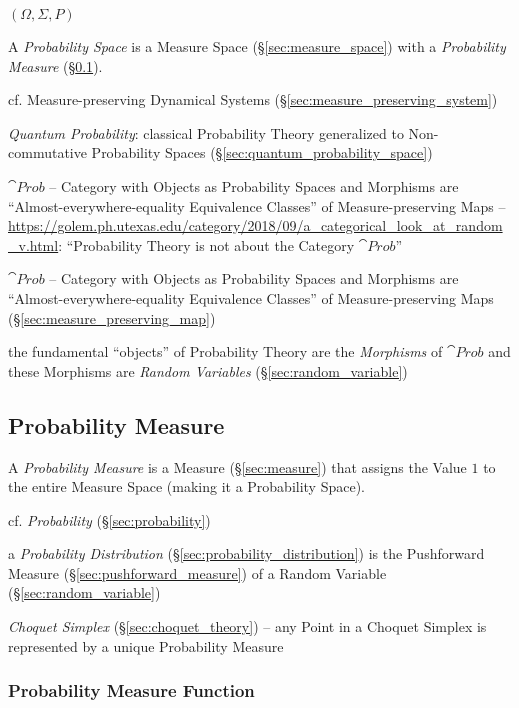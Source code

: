 $(\Omega, \Sigma, P)$

A \emph{Probability Space} is a Measure Space (\S\ref{sec:measure_space}) with a
\emph{Probability Measure} (\S\ref{sec:probability_measure}).

\fist cf. Measure-preserving Dynamical Systems
(\S\ref{sec:measure_preserving_system})

\fist \emph{Quantum Probability}: classical Probability Theory generalized to
Non-commutative Probability Spaces (\S\ref{sec:quantum_probability_space})

$\cat{Prob}$ -- Category with Objects as Probability Spaces and Morphisms are
``Almost-everywhere-equality Equivalence Classes'' of Measure-preserving Maps
--
\url{https://golem.ph.utexas.edu/category/2018/09/a_categorical_look_at_random_v.html}:
``Probability Theory is not about the Category $\cat{Prob}$''

$\cat{Prob}$ -- Category with Objects as Probability Spaces and Morphisms are
``Almost-everywhere-equality Equivalence Classes'' of Measure-preserving Maps
(\S\ref{sec:measure_preserving_map})

the fundamental ``objects'' of Probability Theory are the \emph{Morphisms} of
$\cat{Prob}$ and these Morphisms are \emph{Random Variables}
(\S\ref{sec:random_variable})



\subsection{Probability Measure}\label{sec:probability_measure}

A \emph{Probability Measure} is a Measure (\S\ref{sec:measure}) that assigns the
Value $1$ to the entire Measure Space (making it a Probability Space).

cf. \emph{Probability} (\S\ref{sec:probability})

\fist a \emph{Probability Distribution} (\S\ref{sec:probability_distribution})
is the Pushforward Measure (\S\ref{sec:pushforward_measure}) of a Random
Variable (\S\ref{sec:random_variable})

\emph{Choquet Simplex} (\S\ref{sec:choquet_theory}) -- any Point in a Choquet
Simplex is represented by a unique Probability Measure



\subsubsection{Probability Measure Function}
\label{sec:probability_measure_function}

